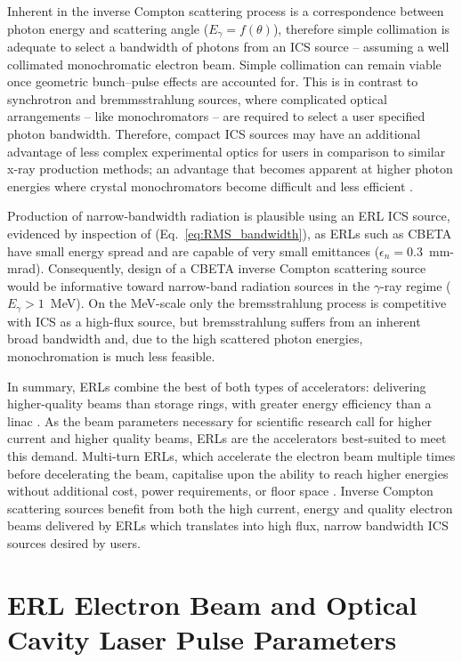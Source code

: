 \documentclass[../main.tex]{subfiles}
\begin{document}
Inherent in the inverse Compton scattering process is a correspondence between photon energy and scattering angle ($E_{\gamma} = f\left(\theta\right)$), therefore simple collimation is adequate to select a bandwidth of photons from an ICS source -- assuming a well collimated monochromatic electron beam. Simple collimation can remain viable once geometric bunch--pulse effects are accounted for. This is in contrast to synchrotron and bremmsstrahlung sources, where complicated optical arrangements -- like monochromators -- are required to select a user specified photon bandwidth. Therefore, compact ICS sources may have an additional advantage of less complex experimental optics for users in comparison to similar x-ray production methods; an advantage that becomes apparent at higher photon energies where crystal monochromators become difficult and less efficient \cite{lienert1998focusing}. 
 
Production of narrow-bandwidth radiation is plausible using an ERL ICS source, evidenced by inspection of (Eq.~\ref{eq:RMS_bandwidth}), as ERLs such as CBETA have small energy spread and are capable of very small emittances ($\epsilon_{n} = 0.3$~\si{\milli\meter}-\si{\milli\radian}). Consequently, design of a CBETA inverse Compton scattering source would be informative toward narrow-band radiation sources in the $\gamma$-ray regime ($E_{\gamma} > 1$~\si{\mega\electronvolt}). On the \si{\mega\electronvolt}-scale only the bremsstrahlung process is competitive with ICS as a high-flux source, but bremsstrahlung suffers from an inherent broad bandwidth and, due to the high scattered photon energies, monochromation is much less feasible.

In summary, ERLs combine the best of both types of accelerators: delivering higher-quality beams than storage rings, with greater energy efficiency than a linac \cite{smith2006optic}. As the beam parameters necessary for scientific research call for higher current and higher quality beams, ERLs are the accelerators best-suited to meet this demand. Multi-turn ERLs, which accelerate the electron beam multiple times before decelerating the beam, capitalise upon the ability to reach higher energies without additional cost, power requirements, or floor space \cite{merminga2003high}. Inverse Compton scattering sources benefit from both the high current, energy and quality electron beams delivered by ERLs which translates into high flux, narrow bandwidth ICS sources desired by users. 

\section{ERL Electron Beam and Optical Cavity Laser Pulse Parameters}
\label{sec:CBETA_electron_laser_parameters}
\end{document}
